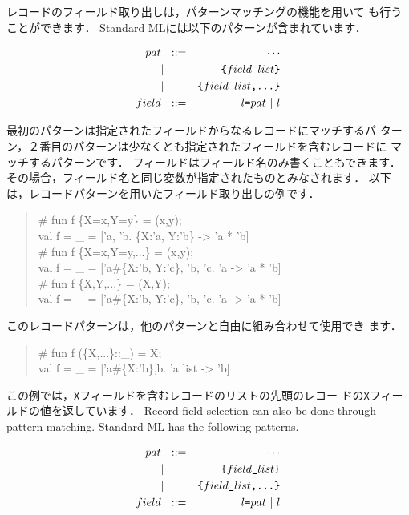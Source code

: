 \documentclass{jbook}
\begin{document}
\ifx\jp%
	レコードのフィールド取り出しは，パターンマッチングの機能を用いて
も行うことができます．
	Standard MLには以下のパターンが含まれています．
\begin{tt}
\begin{eqnarray*}
pat &\mbox{\ \ }::=& \cdots \\
     &|& \mbox{\tt \{$field\_list$\}}
\\
     &|& \mbox{\tt \{$field\_list$,...\}}
\\
field &\mbox{\ \ }::=& \mbox{\tt $l$=$pat$} \ | \ l
\end{eqnarray*}
\end{tt}
	最初のパターンは指定されたフィールドからなるレコードにマッチするパ
ターン，２番目のパターンは少なくとも指定されたフィールドを含むレコードに
マッチするパターンです．
	フィールドはフィールド名のみ書くこともできます．
	その場合，フィールド名と同じ変数が指定されたものとみなされます．
	以下は，レコードパターンを用いたフィールド取り出しの例です．
\begin{tt}\begin{quote}
\# fun f \{X=x,Y=y\} = (x,y);\\
val f = \_ = ['a, 'b. \{X:'a, Y:'b\} -> 'a * 'b]\\
\# fun f \{X=x,Y=y,...\} = (x,y);\\
val f = \_ = ['a\#\{X:'b, Y:'c\}, 'b, 'c. 'a -> 'a * 'b]\\
\# fun f \{X,Y,...\} = (X,Y);\\
val f = \_ = ['a\#\{X:'b, Y:'c\}, 'b, 'c. 'a -> 'a * 'b]
\end{quote}\end{tt}
	このレコードパターンは，他のパターンと自由に組み合わせて使用でき
ます．
\begin{tt}\begin{quote}
\# fun f (\{X,...\}::\_) = X;\\
val f = \_ = ['a\#\{X:'b\},b. 'a list -> 'b]\\
\end{quote}\end{tt}
	この例では，{\tt X}フィールドを含むレコードのリストの先頭のレコー
ドの{\tt X}フィールドの値を返しています．
\else%
	Record field selection can also be done through pattern
matching.
	Standard ML has the following patterns.
\begin{tt}
\begin{eqnarray*}
pat &\mbox{\ \ }::=& \cdots \\
     &|& \mbox{\tt \{$field\_list$\}}
\\
     &|& \mbox{\tt \{$field\_list$,...\}}
\\
field &\mbox{\ \ }::=& \mbox{\tt $l$=$pat$} \ | \ l
\end{eqnarray*}
\end{tt}
\end{document}
